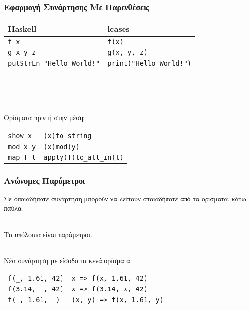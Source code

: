 \documentclass{beamer}
\begin{document}
\begin{frame}[fragile]

\frametitle{Εφαρμογή Συνάρτησης Με Παρενθέσεις}

\begin{otherlanguage}{english}

\begin{center}
\begin{tabular}{ |P{5cm}|P{5cm}| }
 \hline
 Haskell & lcases
 \\
 \hline
 \verb|f x| & \verb|f(x)|
 \\
 \verb|g x y z| & \verb|g(x, y, z)|
 \\
 \verb|putStrLn "Hello World!"| & \verb|print("Hello World!")|
 \\
 \hline
\end{tabular}
\\~\
\\~\
\end{center}

\end{otherlanguage}

Ορίσματα πριν ή στην μέση:
\begin{otherlanguage}{english}
\begin{center}
\begin{tabular}{ |P{5cm}|P{5cm}| }
 \hline
 \verb|show x| & \verb|(x)to_string|
 \\
 \verb|mod x y| & \verb|(x)mod(y)|
 \\
 \verb|map f l| & \verb|apply(f)to_all_in(l)|
 \\
 \hline
\end{tabular}
\end{center}
\end{otherlanguage}

\end{frame}

\begin{frame}[fragile]

\frametitle{Ανώνυμες Παράμετροι}

Σε οποιαδήποτε συνάρτηση μπορούν να λείπουν οποιαδήποτε από τα ορίσματα:
κάτω παύλα.
\\~\

Τα υπόλοιπα είναι παράμετροι.
\\~\

Νέα συνάρτηση με είσοδο τα κενά ορίσματα.
\begin{otherlanguage}{english}
\begin{center}
\begin{tabular}{ |P{5cm}|P{5cm}| }
 \hline
 \verb|f(_, 1.61, 42)| & \verb|x => f(x, 1.61, 42)|
 \\
 \verb|f(3.14, _, 42)| & \verb|x => f(3.14, x, 42)|
 \\
 \verb|f(_, 1.61, _)| & \verb|(x, y) => f(x, 1.61, y)|
 \\
 \hline
\end{tabular}
\end{center}
\end{otherlanguage}

\end{frame}
\end{document}
